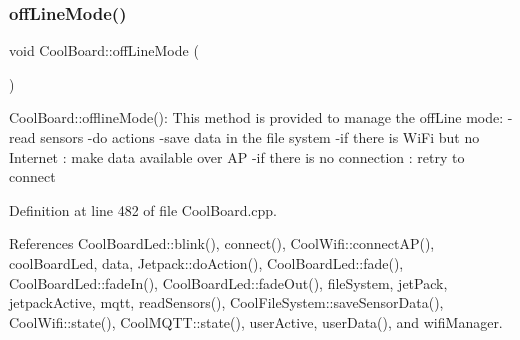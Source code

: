 \mbox{\label{classCoolBoard_ae6b5e1274d760462290192acea4adca8}} 
\subsubsection{\texorpdfstring{off\+Line\+Mode()}{offLineMode()}}
{\footnotesize\ttfamily void Cool\+Board\+::off\+Line\+Mode (\begin{DoxyParamCaption}{ }\end{DoxyParamCaption})}

Cool\+Board\+::offline\+Mode()\+: This method is provided to manage the off\+Line mode\+: -\/read sensors -\/do actions -\/save data in the file system -\/if there is Wi\+Fi but no Internet \+: make data available over AP -\/if there is no connection \+: retry to connect 

Definition at line 482 of file Cool\+Board.\+cpp.



References Cool\+Board\+Led\+::blink(), connect(), Cool\+Wifi\+::connect\+A\+P(), cool\+Board\+Led, data, Jetpack\+::do\+Action(), Cool\+Board\+Led\+::fade(), Cool\+Board\+Led\+::fade\+In(), Cool\+Board\+Led\+::fade\+Out(), file\+System, jet\+Pack, jetpack\+Active, mqtt, read\+Sensors(), Cool\+File\+System\+::save\+Sensor\+Data(), Cool\+Wifi\+::state(), Cool\+M\+Q\+T\+T\+::state(), user\+Active, user\+Data(), and wifi\+Manager.


